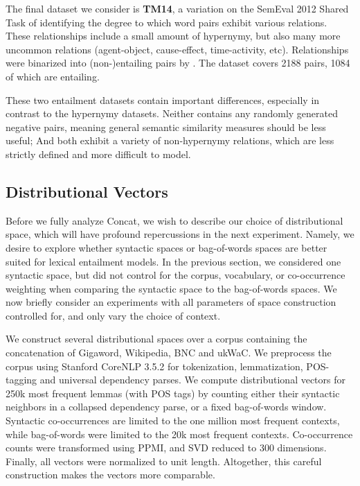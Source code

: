 The final dataset we consider is {\bf TM14}, a variation on the SemEval 2012
Shared Task of identifying the degree to which word pairs exhibit various
relations. These relationships include a small amount of hypernymy, but also
many more uncommon relations (agent-object, cause-effect, time-activity, etc).
Relationships were binarized into (non-)entailing pairs by
.  The dataset covers 2188 pairs, 1084 of which are
entailing.

These two entailment datasets contain important differences, especially in
contrast to the hypernymy datasets. Neither contains any randomly generated
negative pairs, meaning general semantic similarity measures should be less
useful; And both exhibit a variety of non-hypernymy relations, which are less
strictly defined and more difficult to model.

\subsection{Distributional Vectors}

Before we fully analyze Concat, we wish to
describe our choice of distributional space, which will have profound
repercussions in the next experiment. Namely, we desire to explore whether
syntactic spaces or bag-of-words spaces are better suited for lexical
entailment models. In the previous section, we considered one syntactic space,
but did not control for the corpus, vocabulary, or co-occurrence weighting
when comparing the syntactic space to the bag-of-words spaces. We now
briefly consider an experiments with all parameters of space construction
controlled for, and only vary the choice of context.

We construct several distributional spaces over a corpus containing the
concatenation of Gigaword, Wikipedia, BNC and ukWaC.  We preprocess the corpus
using Stanford CoreNLP 3.5.2 \cite{chen:2014:emnlp} for tokenization,
lemmatization, POS-tagging and universal dependency parses. We compute
distributional vectors for 250k most frequent lemmas (with POS tags) by
counting either their syntactic neighbors in a collapsed dependency parse, or a
fixed bag-of-words window. Syntactic co-occurrences are limited to the one
million most frequent contexts, while bag-of-words were limited to the 20k most
frequent contexts. Co-occurrence counts were transformed using PPMI, and SVD
reduced to 300 dimensions. Finally, all vectors were normalized to unit length.
Altogether, this careful construction makes the vectors more comparable.


